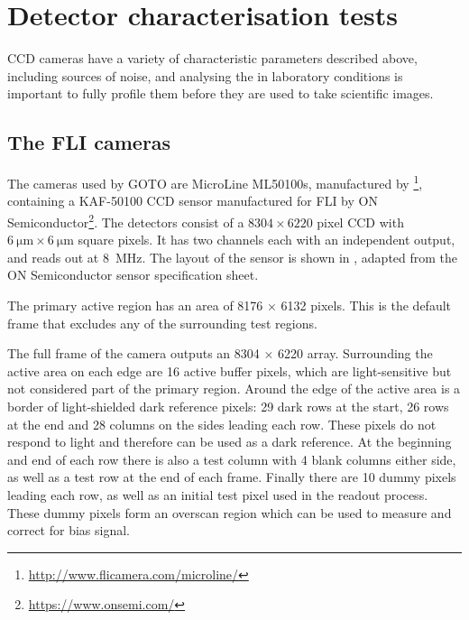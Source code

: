 \section{Detector characterisation tests}
\label{sec:detectors}
\begin{colsection}


\begin{colsection}

CCD cameras have a variety of characteristic parameters described above, including sources of noise, and analysing the in laboratory conditions is important to fully profile them before they are used to take scientific images.

\end{colsection}

\subsection{The FLI cameras}
\label{sec:FLI}
\begin{colsection}

The cameras used by GOTO are MicroLine ML50100s, manufactured by \footnote{\url{http://www.flicamera.com/microline/}}, containing a KAF-50100 CCD sensor manufactured for FLI by ON Semiconductor\footnote{\url{https://www.onsemi.com/}}. The detectors consist of a $8304 \times 6220$ pixel CCD with $\SI{6}{\micro\metre} \times \SI{6}{\micro\metre}$ square pixels. It has two channels each with an independent output, and reads out at \SI{8}{\mega\hertz}. The layout of the sensor is shown in , adapted from the ON Semiconductor sensor specification sheet.

The primary active region has an area of 8176 $\times$ 6132 pixels. This is the default frame that excludes any of the surrounding test regions.

The full frame of the camera outputs an 8304 $\times$ 6220 array. Surrounding the active area on each edge are 16 active buffer pixels, which are light-sensitive but not considered part of the primary region. Around the edge of the active area is a border of light-shielded dark reference pixels: 29 dark rows at the start, 26 rows at the end and 28 columns on the sides leading each row. These pixels do not respond to light and therefore can be used as a dark reference. At the beginning and end of each row there is also a test column with 4 blank columns either side, as well as a test row at the end of each frame. Finally there are 10 dummy pixels leading each row, as well as an initial test pixel used in the readout process. These dummy pixels form an overscan region which can be used to measure and correct for bias signal.


\end{colsection}
\end{colsection}
